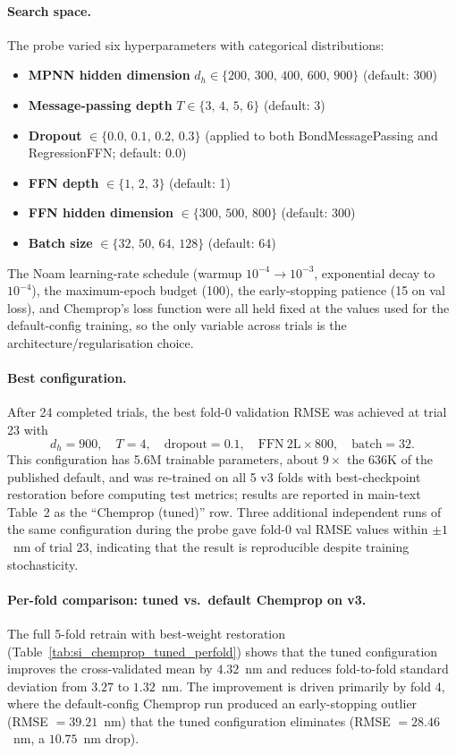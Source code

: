 \documentclass[journal=jcisd8,manuscript=suppinfo]{achemso}
\begin{document}
\paragraph{Search space.}
The probe varied six hyperparameters with categorical distributions:
\begin{itemize}[leftmargin=2em,itemsep=2pt]
 \item \textbf{MPNN hidden dimension} $d_h \in \{200,\, 300,\, 400,\, 600,\, 900\}$ (default: 300)
 \item \textbf{Message-passing depth} $T \in \{3,\, 4,\, 5,\, 6\}$ (default: 3)
 \item \textbf{Dropout} $\in \{0.0,\, 0.1,\, 0.2,\, 0.3\}$ (applied to both BondMessagePassing and RegressionFFN; default: 0.0)
 \item \textbf{FFN depth} $\in \{1,\, 2,\, 3\}$ (default: 1)
 \item \textbf{FFN hidden dimension} $\in \{300,\, 500,\, 800\}$ (default: 300)
 \item \textbf{Batch size} $\in \{32,\, 50,\, 64,\, 128\}$ (default: 64)
\end{itemize}
The Noam learning-rate schedule (warmup $10^{-4} \to 10^{-3}$, exponential decay to $10^{-4}$), the maximum-epoch budget (100), the early-stopping patience (15 on val loss), and Chemprop's loss function were all held fixed at the values used for the default-config training, so the only variable across trials is the architecture/regularisation choice.

\paragraph{Best configuration.}
After 24 completed trials, the best fold-0 validation RMSE was achieved at trial 23 with
\[
 d_h = 900,\quad T = 4,\quad \text{dropout} = 0.1,\quad
 \text{FFN}\ 2\text{L} \times 800,\quad \text{batch} = 32.
\]
This configuration has 5.6M trainable parameters, about $9\times$ the 636K of the published default, and was re-trained on all 5 v3 folds with best-checkpoint restoration before computing test metrics; results are reported in main-text Table~2 as the ``Chemprop (tuned)'' row. Three additional independent runs of the same configuration during the probe gave fold-0 val RMSE values within $\pm 1$~nm of trial 23, indicating that the result is reproducible despite training stochasticity.

\paragraph{Per-fold comparison: tuned vs.\ default Chemprop on v3.}
The full 5-fold retrain with best-weight restoration (Table~\ref{tab:si_chemprop_tuned_perfold}) shows that the tuned configuration improves the cross-validated mean by $4.32$~nm and reduces fold-to-fold standard deviation from $3.27$ to $1.32$~nm. The improvement is driven primarily by fold 4, where the default-config Chemprop run produced an early-stopping outlier (RMSE $= 39.21$~nm) that the tuned configuration eliminates (RMSE $= 28.46$~nm, a $10.75$~nm drop).
\end{document}
